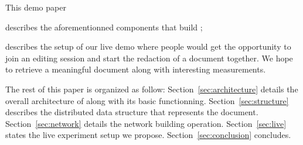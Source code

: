 This demo paper
\begin{inparaenum}[(i)]
\item describes the aforementionned components that build \CRATE;
\item describes the setup of our live demo where people would get the
  opportunity to join an editing session and start the redaction of a document
  together. We hope to retrieve a meaningful document along with interesting
  measurements.
\end{inparaenum}

The rest of this paper is organized as follow: Section~\ref{sec:architecture}
details the overall architecture of \CRATE along with its basic
functionning. Section~\ref{sec:structure} describes the distributed data
structure that represents the document. Section~\ref{sec:network} details the
network building operation. Section~\ref{sec:live} states the live experiment
setup we propose. Section~\ref{sec:conclusion} concludes.


